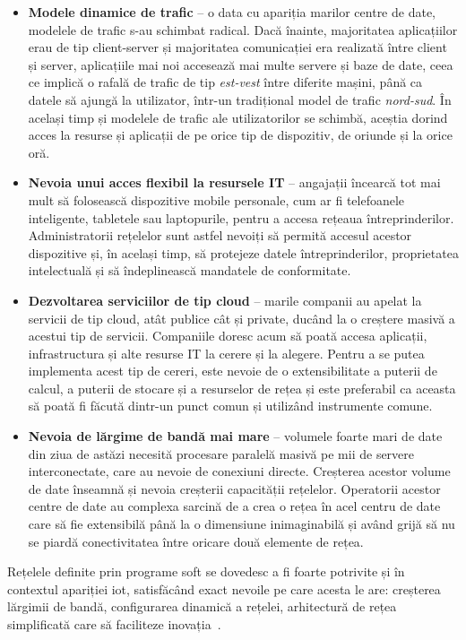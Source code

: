 \begin{itemize}
	\item \textbf{Modele dinamice de trafic} – o data cu apariția marilor centre de date, modelele de trafic s-au schimbat radical. Dacă înainte, majoritatea aplicațiilor erau de tip client-server și majoritatea comunicației era realizată între client și server, aplicațiile mai noi accesează mai multe servere și baze de date, ceea ce implică o rafală de trafic de tip \textit{est-vest} între diferite mașini, până ca datele să ajungă la utilizator, într-un tradițional model de trafic \textit{nord-sud}. În același timp și modelele de trafic ale utilizatorilor se schimbă, aceștia dorind acces la resurse și aplicații de pe orice tip de dispozitiv, de oriunde și la orice oră.
	\item \textbf{Nevoia unui acces flexibil la resursele IT} – angajații încearcă tot mai mult să folosească dispozitive mobile personale, cum ar fi telefoanele inteligente, tabletele sau laptopurile, pentru a accesa rețeaua întreprinderilor. Administratorii rețelelor sunt astfel nevoiți să permită accesul acestor dispozitive și, în același timp, să protejeze datele întreprinderilor, proprietatea intelectuală și să îndeplinească mandatele de conformitate.
	\item \textbf{Dezvoltarea serviciilor de tip cloud} – marile companii au apelat la servicii de tip cloud, atât publice cât și private, ducând la o creștere masivă a acestui tip de servicii. Companiile doresc acum să poată accesa aplicații, infrastructura și alte resurse IT la cerere și la alegere. Pentru a se putea implementa acest tip de cereri, este nevoie de o extensibilitate a puterii de calcul, a puterii de stocare și a resurselor de rețea și este preferabil ca aceasta să poată fi făcută dintr-un punct comun și utilizând instrumente comune.
	\item \textbf{Nevoia de lărgime de bandă mai mare} – volumele foarte mari de date din ziua de astăzi necesită procesare paralelă masivă pe mii de servere interconectate, care au nevoie de conexiuni directe. Creșterea acestor volume de date înseamnă și nevoia creșterii capacității rețelelor. Operatorii acestor centre de date au complexa sarcină de a crea o rețea în acel centru de date care să fie extensibilă până la o dimensiune inimaginabilă și având grijă să nu se piardă conectivitatea între oricare două elemente de rețea.	
\end{itemize}

Rețelele definite prin programe soft se dovedesc a fi foarte potrivite și în contextul apariției \gls{iot}, satisfăcând exact nevoile pe care acesta le are: creșterea lărgimii de bandă, configurarea dinamică a rețelei, arhitectură de rețea simplificată care să faciliteze inovația~\cite{qin2014software}.

